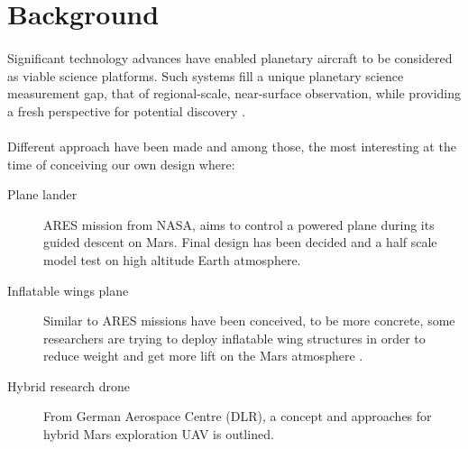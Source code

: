 \section{Background}
\paragraph{} Significant technology advances have enabled planetary aircraft to be considered as viable science platforms.
Such systems fill a unique planetary science measurement gap, that of regional-scale, near-surface observation,
while providing a fresh perspective for potential discovery \cite{Braun2006}.

\paragraph{} Different approach have been made and among those, the most interesting at the time of conceiving our own design where:
\begin{description}
	\item[Plane lander] ARES mission from NASA, aims to control a powered plane during its guided descent on Mars. Final design has been decided\cite{Smith2004} and a half scale model test on high altitude Earth atmosphere.   \\
	\item[Inflatable wings plane] Similar to ARES missions have been conceived, to be more concrete, some researchers are trying to deploy inflatable wing structures in order to reduce weight and get more lift on the Mars atmosphere \cite{Simpson2005}.
	\item[Hybrid research drone] From German Aerospace Centre (DLR), a concept and approaches for hybrid Mars exploration UAV is outlined\cite{Singer2013}. 
\end{description}
